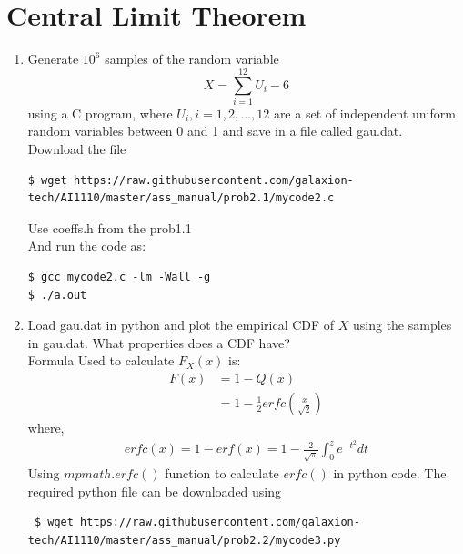 \documentclass[journal,12pt,twocolumn]{IEEEtran}
\renewcommand\thesection{\arabic{section}}
\begin{document}
\section{Central Limit Theorem}
\begin{enumerate}[label=\thesection.\arabic*.,ref=\thesection.\theenumi]


\item Generate $10^6$ samples of the random variable
    \begin{equation}
        X=\sum_{i=1}^{12} U_i-6        
    \end{equation}
    using a C program, where $U_i, i = 1, 2,\ldots, 12$ are a set of independent uniform random variables between 0 and 1 and save in a file called gau.dat.\\
    
    
    \solution Download the file

    \begin{lstlisting}    
$ wget https://raw.githubusercontent.com/galaxion-tech/AI1110/master/ass_manual/prob2.1/mycode2.c
    \end{lstlisting}

    Use coeffs.h from the prob1.1\\
    And run the code as:

    \begin{lstlisting}
$ gcc mycode2.c -lm -Wall -g
$ ./a.out
\end{lstlisting}

\item Load gau.dat in python and plot the empirical CDF of $X$ using the samples in gau.dat. What properties does a CDF have?\\

\solution
    Formula Used to calculate $F_X(x)$ is:
    \begin{align}
        F(x)&=1-Q(x)\\
            &=1-\frac{1}{2}erfc(\frac{x}{\sqrt{2}}) 
    \end{align}
    where,
    \begin{align}
        erfc(x)=1-erf(x) = 1-\frac{2}{\sqrt{\pi}}\int_0^z e^{-t^2}dt
    \end{align}
    Using $mpmath.erfc()$ function to calculate $erfc()$ in python code.
    The required python file can be downloaded using

    \begin{lstlisting}
 $ wget https://raw.githubusercontent.com/galaxion-tech/AI1110/master/ass_manual/prob2.2/mycode3.py
\end{lstlisting}


\end{enumerate}
\end{document}
